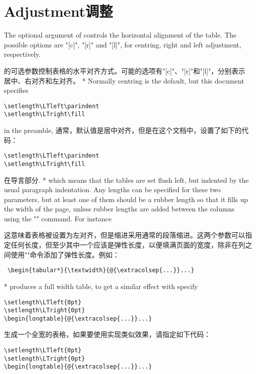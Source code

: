 
\section{Adjustment\hfill 调整}
\begin{paracol}{2}
The optional argument of  controls the
horizontal alignment of the table. The possible options are "[c]",
"[r]" and "[l]", for  centring,
right  and left adjustment, respectively.
\switchcolumn 

的可选参数控制表格的水平对齐方式。可能的选项有"[c]"、"[r]"和"[l]"，分别表示居中、右对齐和左对齐。
\switchcolumn[0]*
\DescribeMacro{\LTleft}
Normally centring is the default, but this document specifies
\begin{verbatim}
\setlength\LTleft\parindent
\setlength\LTright\fill
\end{verbatim}
in the preamble,
\switchcolumn 
\DescribeMacro{\LTleft}
通常，默认值是居中对齐，但是在这个文档中，设置了如下的代码：
\DescribeMacro{\LTright}
\begin{verbatim}
\setlength\LTleft\parindent
\setlength\LTright\fill
\end{verbatim}
在导言部分.
\switchcolumn[0]*
\DescribeMacro{\LTright}
 which means that the tables are set flush left, but
indented by the usual paragraph indentation. Any lengths can be
specified for these two parameters, but at least one of them should be
a rubber length so that it fills up the width of the page, unless
rubber lengths are added between the columns using the
"\extracolsep" command.
For instance
\switchcolumn 

这意味着表格被设置为左对齐，但是缩进采用通常的段落缩进。这两个参数可以指定任何长度，但至少其中一个应该是弹性长度，以便填满页面的宽度，除非在列之间使用"\extracolsep"命令添加了弹性长度。例如：

\begin{verbatim}
 \begin{tabular*}{\textwidth}{@{\extracolsep{...}}...}
\end{verbatim}

\switchcolumn[0]*
produces a full width table, to get a similar effect with
 specify
\begin{verbatim}
\setlength\LTleft{0pt}
\setlength\LTright{0pt}
\begin{longtable}{@{\extracolsep{...}}...}
\end{verbatim}
\switchcolumn 
生成一个全宽的表格，如果要使用实现类似效果，请指定如下代码：
\begin{verbatim}
\setlength\LTleft{0pt}
\setlength\LTright{0pt}
\begin{longtable}{@{\extracolsep{...}}...}
\end{verbatim}
\end{paracol}
 